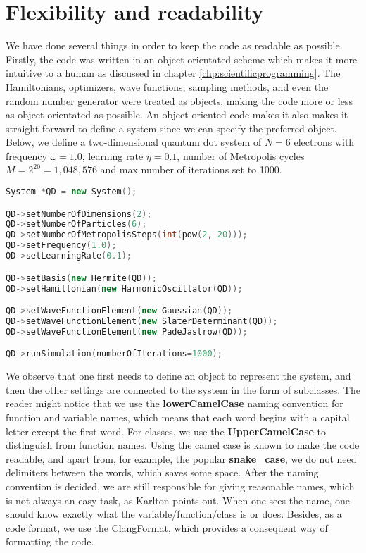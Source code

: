 \section{Flexibility and readability}
We have done several things in order to keep the code as readable as possible. Firstly, the code was written in an object-orientated scheme which makes it more intuitive to a human as discussed in chapter \ref{chp:scientificprogramming}. The Hamiltonians, optimizers, wave functions, sampling methods, and even the random number generator were treated as objects, making the code more or less as object-orientated as possible. An object-oriented code makes it also makes it straight-forward to define a system since we can specify the preferred object. Below, we define a two-dimensional quantum dot system of $N=6$ electrons with frequency $\omega=1.0$, learning rate $\eta=0.1$, number of Metropolis cycles $M=2^{20}=1,048,576$ and max number of iterations set to 1000.

\begin{lstlisting}[language={C++}, caption={Example on how a quantum dot system can be initialized.}, label={lst:qd}]
System *QD = new System();

QD->setNumberOfDimensions(2);
QD->setNumberOfParticles(6);
QD->setNumberOfMetropolisSteps(int(pow(2, 20)));
QD->setFrequency(1.0);
QD->setLearningRate(0.1);

QD->setBasis(new Hermite(QD));
QD->setHamiltonian(new HarmonicOscillator(QD));

QD->setWaveFunctionElement(new Gaussian(QD));
QD->setWaveFunctionElement(new SlaterDeterminant(QD));
QD->setWaveFunctionElement(new PadeJastrow(QD));

QD->runSimulation(numberOfIterations=1000);
\end{lstlisting}
We observe that one first needs to define an object to represent the system, and then the other settings are connected to the system in the form of subclasses. The reader might notice that we use the \textbf{lowerCamelCase} naming convention for function and variable names, which means that each word begins with a capital letter except the first word. For classes, we use the \textbf{UpperCamelCase} to distinguish from function names. Using the camel case is known to make the code readable, and apart from, for example, the popular \textbf{snake\_case}, we do not need delimiters between the words, which saves some space. After the naming convention is decided, we are still responsible for giving reasonable names, which is not always an easy task, as Karlton points out. When one sees the name, one should know exactly what the variable/function/class is or does. Besides, as a code format, we use the ClangFormat, which provides a consequent way of formatting the code. 

